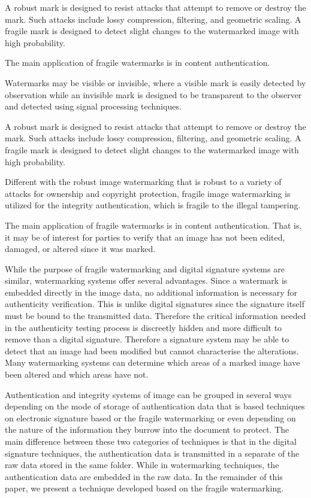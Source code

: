\documentclass[runningheads]{llncs}
\begin{document}
A robust mark is designed to resist attacks that attempt to remove or destroy the mark. Such attacks include
lossy compression, filtering, and geometric scaling. A fragile mark is designed to detect slight changes to the watermarked image with high probability.

The main application of fragile watermarks is in content authentication.

Watermarks may be visible or invisible, where a visible mark is easily detected by observation while an invisible mark is designed to be transparent to the observer and detected using signal processing techniques.

A robust mark is designed to resist attacks that attempt to remove or destroy the mark. Such attacks include lossy compression, filtering, and geometric scaling. A fragile mark is designed to detect slight changes to the watermarked image with high probability.

Different with the robust image watermarking that is robust to a variety of attacks for ownership and copyright protection, fragile image watermarking is utilized for the integrity authentication, which is fragile to the illegal tampering.

The main application of fragile watermarks is in content authentication. That is, it may be of interest for parties to verify that an image has not been edited, damaged, or altered since it was marked.

While the purpose of fragile watermarking and digital signature systems are similar, watermarking systems offer several advantages. Since a watermark is embedded directly in the image data, no additional information is necessary for authenticity verification. This is unlike digital signatures since the signature itself must be bound to the transmitted data. Therefore the critical information needed in the authenticity testing process is discreetly hidden and more difficult to remove than a digital signature. Therefore a signature system may be able to detect that an image had been modified but cannot characterise the alterations. Many watermarking systems can determine which areas of a marked image have been altered and which areas have not.

Authentication and integrity systems of image can be grouped in several ways depending on the mode of storage
of authentication data that is based techniques on electronic signature based or the fragile watermarking or
even depending on the nature of the information they burrow into the document to protect. The main difference
between these two categories of techniques is that in the digital signature techniques, the authentication data is
transmitted in a separate of the raw data stored in the same folder. While in watermarking techniques, the
authentication data are embedded in the raw data. In the remainder of this paper, we present a technique developed
based on the fragile watermarking. \cite{boujemaa2016fragile}
\end{document}
